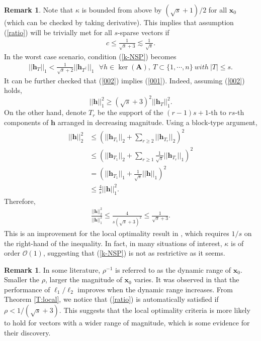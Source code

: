 \documentclass[11pt]{article}
\numberwithin{equation}{section}
\theoremstyle{plain}
\theoremstyle{definition}
\newtheorem{Rem}[Th]{Remark}
\def\A{{\mathbf A}}
\def\x{{\mathbf x}}
\def\h{{\mathbf{h}}}
\begin{document}
\begin{Rem}
Note that $\kappa$ is bounded from above by $(\sqrt{s}+1)/2$ for all $\x_0$ (which can be checked by taking derivative). This implies that assumption (\ref{ratio}) will be trivially met for all $s$-sparse vectors if 
\begin{align}
c\leq\frac{1}{\sqrt{s}+3}\lesssim\frac{1}{\sqrt{s}}. \label{001}
\end{align}
In the worst case scenario, condition (\ref{k-NSP})  becomes
\begin{align}
||\h_T||_1<\frac{1}{\sqrt{s}+2}||\h_{T^\complement}||_1\ \ \ \forall h\in\ker(\A), \ T\subset\{1, \cdots, n\}\ with\ |T|\leq s. \label{002}
\end{align}
It can be further checked that (\ref{002}) implies (\ref{001}). Indeed, assuming (\ref{002}) holds, $$||\h||^2_1\geq(\sqrt{s}+3)^2||\h_T||_1^2.$$ On the other hand, denote $T_r$ be the support of the $(r-1)s+1$-th to $rs$-th components of $\h$ arranged in decreasing magnitude. Using a block-type argument, 
\begin{align*}
||\h||^2_2&\leq \left(||\h_{T_1}||_2+\sum_{r\geq 2}||\h_{T_r}||_2\right)^2\\
&\leq \left(||\h_{T_1}||_2+\sum_{r\geq 1}\frac{1}{\sqrt{s}}||\h_{T_r}||_1\right)^2\\
&= \left(||\h_{T_1}||_1+\frac{1}{\sqrt{s}}||\h||_1\right)^2\\
&\leq\frac{4}{s}||\h||^2_1.
\end{align*}
Therefore,
\begin{align*}
\frac{||\h||^2_2}{||\h||_1^2}\leq\frac{4}{s(\sqrt{s}+3)^2}\leq \frac{1}{\sqrt{s}+3}. 
\end{align*}   
This is an improvement for the local optimality result in \cite{rahimi2018scale}, which requires $1/s$ on the right-hand of the inequality. In fact, in many situations of interest, $\kappa$ is of order $\mathcal{O}(1)$, suggesting that (\ref{k-NSP}) is not as restrictive as it seems.    
\end{Rem}

\begin{Rem}
In some literature, $\rho^{-1}$ is referred to as the dynamic range of $\x_0$. Smaller the $\rho$, larger the magnitude of $\x_0$ varies. It was observed in \cite{rahimi2018scale} that the performance of $\ell_1/\ell_2$ improves when the dynamic range increases. From Theorem \ref{T:local}, we notice that  (\ref{ratio}) is automatically satisfied if $\rho<1/(\sqrt{s}+3)$. This suggests that the local optimality criteria is more likely to hold for vectors with a wider range of magnitude, which is some evidence for their discovery. 
\end{Rem}
\end{document}
